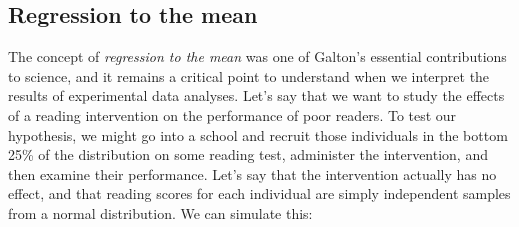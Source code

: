 \documentclass[]{book}
\newenvironment{Shaded}{\begin{snugshade}}{\end{snugshade}}
\newcommand{\KeywordTok}[1]{\textcolor[rgb]{0.13,0.29,0.53}{\textbf{#1}}}
\newcommand{\DataTypeTok}[1]{\textcolor[rgb]{0.13,0.29,0.53}{#1}}
\newcommand{\DecValTok}[1]{\textcolor[rgb]{0.00,0.00,0.81}{#1}}
\newcommand{\FloatTok}[1]{\textcolor[rgb]{0.00,0.00,0.81}{#1}}
\newcommand{\StringTok}[1]{\textcolor[rgb]{0.31,0.60,0.02}{#1}}
\newcommand{\CommentTok}[1]{\textcolor[rgb]{0.56,0.35,0.01}{\textit{#1}}}
\newcommand{\OtherTok}[1]{\textcolor[rgb]{0.56,0.35,0.01}{#1}}
\newcommand{\OperatorTok}[1]{\textcolor[rgb]{0.81,0.36,0.00}{\textbf{#1}}}
\newcommand{\NormalTok}[1]{#1}
\theoremstyle{definition}
\theoremstyle{definition}
\theoremstyle{definition}
\theoremstyle{remark}
\begin{document}
\subsection{Regression to the mean}\label{regression-to-the-mean}

The concept of \emph{regression to the mean} was one of Galton's
essential contributions to science, and it remains a critical point to
understand when we interpret the results of experimental data analyses.
Let's say that we want to study the effects of a reading intervention on
the performance of poor readers. To test our hypothesis, we might go
into a school and recruit those individuals in the bottom 25\% of the
distribution on some reading test, administer the intervention, and then
examine their performance. Let's say that the intervention actually has
no effect, and that reading scores for each individual are simply
independent samples from a normal distribution. We can simulate this:

\begin{Shaded}
\end{Shaded}
\end{document}
